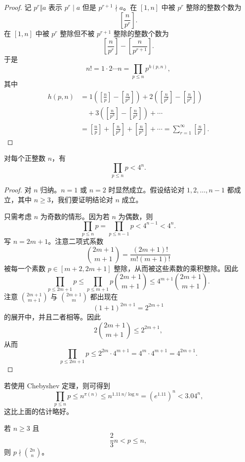 \begin{proof}
	记 $p^r\Vert a$ 表示 $p^r\mid a$ 但是 $p^{r+1}\nmid a$。在 $[1,n]$ 中被 $p^r$ 整除的整数个数为
	\[
		\left[\frac n{p^r}\right].
	\]
	在 $[1,n]$ 中被 $p^r$ 整除但不被 $p^{r+1}$ 整除的整数个数为
	\[
		\left[\frac n{p^r}\right]
		-
		\left[\frac n{p^{r+1}}\right].
	\]
	于是
	\[
		n!=1\cdot 2\cdots n=\prod_{p\leq n}p^{h(p,n)},
	\]
	其中
	\[
	\begin{aligned}
		h(p,n)
		&=
		1\left(\left[\frac np\right]-\left[\frac n{p^2}\right]\right)
		+
		2\left(\left[\frac n{p^2}\right]-\left[\frac n{p^3}\right]\right)\\
		&\quad+
		3\left(\left[\frac n{p^3}\right]-\left[\frac n{p^4}\right]\right)
		+\cdots\\
		&=
		\left[\frac np\right]
		+
		\left[\frac n{p^2}\right]
		+
		\left[\frac n{p^3}\right]
		+\cdots
		=
		\sum_{r=1}^{\infty}\left[\frac{n}{p^r}\right].
	\end{aligned}
	\]
\end{proof}

\begin{lemma}[原文 Lemma 3.14]
	对每个正整数 $n$，有
	\[
		\prod_{p\leq n}p<4^n.
	\]
\end{lemma}

\begin{proof}
	对 $n$ 归纳。$n=1$ 或 $n=2$ 时显然成立。假设结论对 $1,2,\ldots,n-1$ 都成立，其中 $n\geq 3$，我们要证明结论对 $n$ 成立。

	只需考虑 $n$ 为奇数的情形。因为若 $n$ 为偶数，则
	\[
		\prod_{p\leq n}p
		=
		\prod_{p\leq n-1}p
		<
		4^{n-1}<4^n.
	\]
	写 $n=2m+1$。注意二项式系数
	\[
		\binom{2m+1}{m+1}
		=
		\frac{(2m+1)!}{m!(m+1)!}
	\]
	被每一个素数 $p\in[m+2,2m+1]$ 整除，从而被这些素数的乘积整除。因此
	\[
		\prod_{p\leq 2m+1}p
		\leq
		\prod_{p\leq m+1}p\binom{2m+1}{m+1}
		\leq
		4^{m+1}\binom{2m+1}{m+1}.
	\]
	注意 $\binom{2m+1}{m+1}$ 与 $\binom{2m+1}{m}$ 都出现在
	\[
		(1+1)^{2m+1}=2^{2m+1}
	\]
	的展开中，并且二者相等。因此
	\[
		2\binom{2m+1}{m+1}\leq 2^{2m+1},
	\]
	从而
	\[
		\prod_{p\leq 2m+1}p
		\leq
		2^{2m}\cdot 4^{m+1}
		=
		4^m\cdot 4^{m+1}
		=
		4^{2m+1}.
	\]
\end{proof}

\begin{remark}
	若使用 Chebyshev 定理，则可得到
	\[
		\prod_{p\leq n}p
		\leq
		n^{\pi(n)}
		\leq
		n^{1.11\, n/\log n}
		=
		(e^{1.11})^n
		<
		3.04^n,
	\]
	这比上面的估计略好。
\end{remark}

\begin{lemma}[原文 Lemma 3.15]
	若 $n\geq 3$ 且
	\[
		\frac23 n<p\leq n,
	\]
	则 $p\nmid \binom{2n}{n}$。
\end{lemma}

